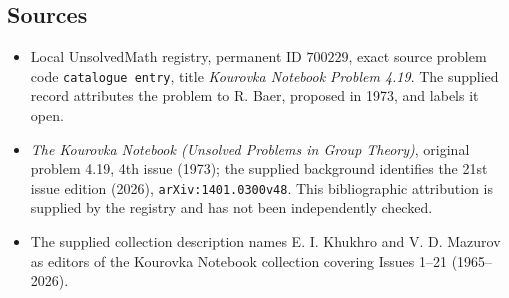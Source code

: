 \documentclass[11pt]{article}
\begin{document}
\subsection{Sources}
\begin{itemize}
\item Local UnsolvedMath registry, permanent ID \(700229\), exact source problem code \texttt{catalogue entry}, title \emph{Kourovka Notebook Problem 4.19}. The supplied record attributes the problem to R. Baer, proposed in 1973, and labels it open.
\item \emph{The Kourovka Notebook (Unsolved Problems in Group Theory)}, original problem 4.19, 4th issue (1973); the supplied background identifies the 21st issue edition (2026), \texttt{arXiv:1401.0300v48}. This bibliographic attribution is supplied by the registry and has not been independently checked.
\item The supplied collection description names E. I. Khukhro and V. D. Mazurov as editors of the Kourovka Notebook collection covering Issues 1--21 (1965--2026).
\end{itemize}
\end{document}
